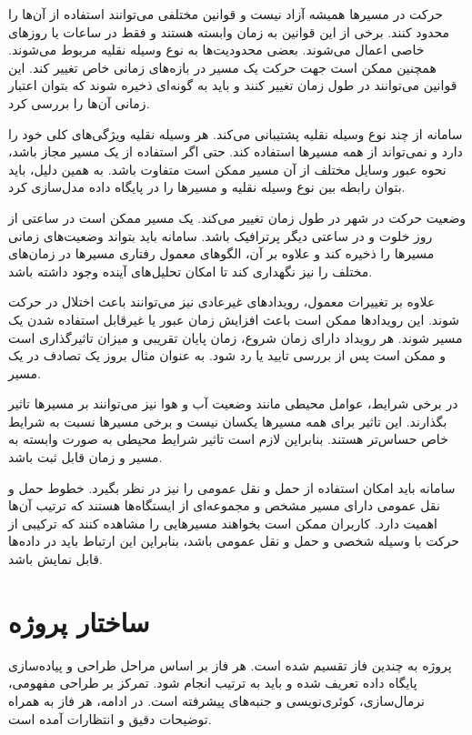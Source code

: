 \documentclass[12pt,a4paper]{article}
\begin{document}
حرکت در مسیرها همیشه آزاد نیست و قوانین مختلفی می‌توانند استفاده از آن‌ها را محدود کنند. برخی از این قوانین به زمان وابسته هستند و فقط در ساعات یا روزهای خاصی اعمال می‌شوند. بعضی محدودیت‌ها به نوع وسیله نقلیه مربوط می‌شوند. همچنین ممکن است جهت حرکت یک مسیر در بازه‌های زمانی خاص تغییر کند. این قوانین می‌توانند در طول زمان تغییر کنند و باید به گونه‌ای ذخیره شوند که بتوان اعتبار زمانی آن‌ها را بررسی کرد.

سامانه از چند نوع وسیله نقلیه پشتیبانی می‌کند. هر وسیله نقلیه ویژگی‌های کلی خود را دارد و نمی‌تواند از همه مسیرها استفاده کند. حتی اگر استفاده از یک مسیر مجاز باشد، نحوه عبور وسایل مختلف از آن مسیر ممکن است متفاوت باشد. به همین دلیل، باید بتوان رابطه بین نوع وسیله نقلیه و مسیرها را در پایگاه داده مدل‌سازی کرد.

وضعیت حرکت در شهر در طول زمان تغییر می‌کند. یک مسیر ممکن است در ساعتی از روز خلوت و در ساعتی دیگر پرترافیک باشد. سامانه باید بتواند وضعیت‌های زمانی مسیرها را ذخیره کند و علاوه بر آن، الگوهای معمول رفتاری مسیرها در زمان‌های مختلف را نیز نگهداری کند تا امکان تحلیل‌های آینده وجود داشته باشد.

علاوه بر تغییرات معمول، رویدادهای غیرعادی نیز می‌توانند باعث اختلال در حرکت شوند. این رویدادها ممکن است باعث افزایش زمان عبور یا غیرقابل استفاده شدن یک مسیر شوند. هر رویداد دارای زمان شروع، زمان پایان تقریبی و میزان تاثیرگذاری است و ممکن است پس از بررسی تایید یا رد شود. به عنوان مثال بروز یک تصادف در یک مسیر.

در برخی شرایط، عوامل محیطی مانند وضعیت آب و هوا نیز می‌توانند بر مسیرها تاثیر بگذارند. این تاثیر برای همه مسیرها یکسان نیست و برخی مسیرها نسبت به شرایط خاص حساس‌تر هستند. بنابراین لازم است تاثیر شرایط محیطی به صورت وابسته به مسیر و زمان قابل ثبت باشد.

سامانه باید امکان استفاده از حمل و نقل عمومی را نیز در نظر بگیرد. خطوط حمل و نقل عمومی دارای مسیر مشخص و مجموعه‌ای از ایستگاه‌ها هستند که ترتیب آن‌ها اهمیت دارد. کاربران ممکن است بخواهند مسیرهایی را مشاهده کنند که ترکیبی از حرکت با وسیله شخصی و حمل و نقل عمومی باشد، بنابراین این ارتباط باید در داده‌ها قابل نمایش باشد.

\newpage
\section{ساختار پروژه}
پروژه به چندین فاز تقسیم شده است. هر فاز بر اساس مراحل طراحی و پیاده‌سازی پایگاه داده تعریف شده و باید به ترتیب انجام شود. تمرکز بر طراحی مفهومی، نرمال‌سازی، کوئری‌نویسی و جنبه‌های پیشرفته است. در ادامه، هر فاز به همراه توضیحات دقیق و انتظارات آمده است.
\end{document}
